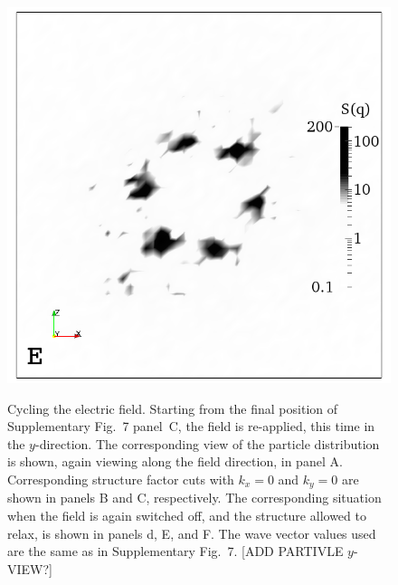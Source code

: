 \documentclass[12pt,twoside]{article}
\begin{document}
\begin{figure}[!h]
\begin{center}
\includegraphics[width=0.32\columnwidth]{sq_y_run1344.png}\\
\end{center}
\caption{Cycling the electric field. Starting from the final position of
Supplementary Fig.~7 panel~C, the field is re-applied, this time in the
$y$-direction. The corresponding view of the particle distribution is
shown, again viewing along the field direction, in panel A.
Corresponding structure factor cuts with $k_x = 0$ and $k_y = 0$ are
shown in panels B and C, respectively. The corresponding situation when
the field is again switched off, and the structure allowed to relax,
is shown in panels d, E, and F. The wave vector values used are the
same as in Supplementary Fig.~7. [ADD PARTIVLE $y$-VIEW?]}
\end{figure}

\newpage
\end{document}
